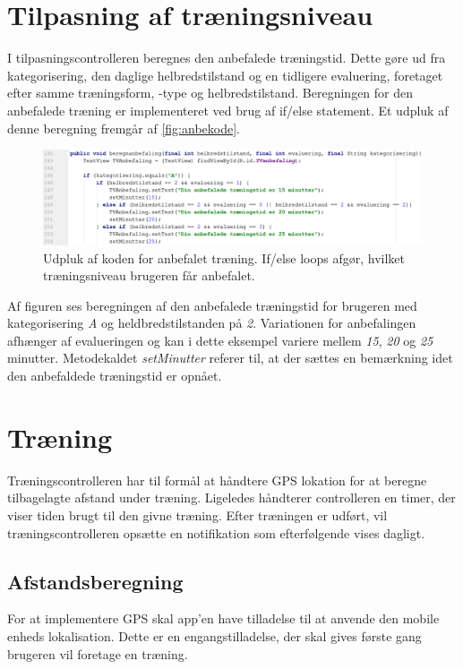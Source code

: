 \section{Tilpasning af træningsniveau}
I tilpasningscontrolleren beregnes den anbefalede træningstid. Dette gøre ud fra kategorisering, den daglige helbredstilstand og en tidligere evaluering, foretaget efter samme træningsform, -type og helbredstilstand.
Beregningen for den anbefalede træning er implementeret ved brug af if/else statement. Et udpluk af denne beregning fremgår af \autoref{fig:anbekode}.  
   
\begin{figure} [H]
\centering
\includegraphics[width=1\textwidth]{figures/imple/anbekode}
\caption{Udpluk af koden for anbefalet træning. If/else loops afgør, hvilket træningsniveau brugeren får anbefalet.}
\label{fig:anbekode}
\end{figure} 

\noindent
Af figuren ses beregningen af den anbefalede træningstid for brugeren med kategorisering \textit{A} og heldbredstilstanden på \textit{2}. Variationen for anbefalingen afhænger af evalueringen og kan i dette eksempel variere mellem \textit{15}, \textit{20} og \textit{25}  minutter. Metodekaldet \textit{setMinutter} referer til, at der sættes en bemærkning idet den anbefaldede træningstid er opnået.

\section{Træning}
Træningscontrolleren har til formål at håndtere GPS lokation for at beregne tilbagelagte afstand under træning. Ligeledes håndterer controlleren en timer, der viser tiden brugt til den givne træning. Efter træningen er udført, vil træningscontrolleren opsætte en notifikation som efterfølgende vises dagligt. 


\subsection{Afstandsberegning}
For at implementere GPS skal app'en have tilladelse til at anvende den mobile enheds lokalisation. Dette er en engangstilladelse, der skal gives første gang brugeren vil foretage en træning. 

